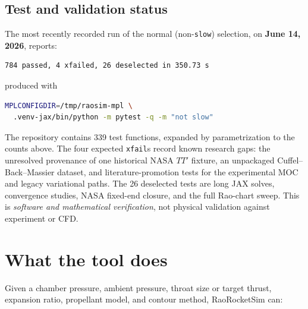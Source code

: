 \documentclass[11pt]{article}
\newcommand{\code}[1]{\texttt{#1}}
\begin{document}
\subsection{Test and validation status}

The most recently recorded run of the normal (non-\code{slow}) selection, on
\textbf{June 14, 2026}, reports:

\begin{lstlisting}
784 passed, 4 xfailed, 26 deselected in 350.73 s
\end{lstlisting}

produced with

\begin{lstlisting}[language=bash]
MPLCONFIGDIR=/tmp/raosim-mpl \
  .venv-jax/bin/python -m pytest -q -m "not slow"
\end{lstlisting}

The repository contains 339 test functions, expanded by parametrization to
the counts above. The four expected \code{xfail}s record known research gaps:
the unresolved provenance of one historical NASA $TT'$ fixture, an unpackaged
Cuffel--Back--Massier dataset, and literature-promotion tests for the
experimental MOC and legacy variational paths. The 26 deselected tests are
long JAX solves, convergence studies, NASA fixed-end closure, and the full
Rao-chart sweep. This is \emph{software and mathematical verification}, not
physical validation against experiment or CFD.

\section{What the tool does}

Given a chamber pressure, ambient pressure, throat size or target thrust,
expansion ratio, propellant model, and contour method, RaoRocketSim can:
\end{document}
